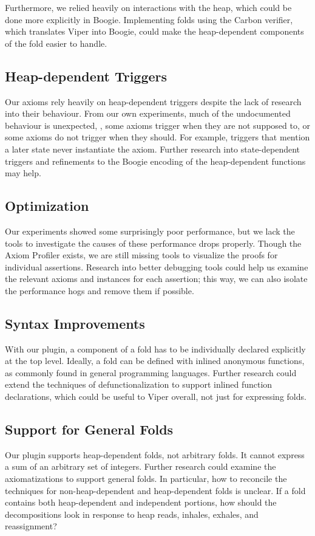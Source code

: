 \documentclass[msc,oneside]{ubcthesis}
\begin{document}
Furthermore, we relied heavily on interactions with the heap, which could be done more explicitly in Boogie. Implementing folds using the Carbon verifier, which translates Viper into Boogie, could make the heap-dependent components of the fold easier to handle. 

\subsection{Heap-dependent Triggers}
Our axioms rely heavily on heap-dependent triggers despite the lack of research into their behaviour. From our own experiments, much of the undocumented behaviour is unexpected, \ie, some axioms trigger when they are not supposed to, or some axioms do not trigger when they should. For example, triggers that mention a later state never instantiate the axiom. Further research into state-dependent triggers and refinements to the Boogie encoding of the heap-dependent functions may help. 


\subsection{Optimization}
Our experiments showed some surprisingly poor performance, but we lack the tools to investigate the causes of these performance drops properly. Though the Axiom Profiler exists, we are still missing tools to visualize the proofs for individual assertions. Research into better debugging tools could help us examine the relevant axioms and instances for each assertion; this way, we can also isolate the performance hogs and remove them if possible.

\subsection{Syntax Improvements}
With our plugin, a component of a fold has to be individually declared explicitly at the top level. Ideally, a fold can be defined with inlined anonymous functions, as commonly found in general programming languages. Further research could extend the techniques of defunctionalization to support inlined function declarations, which could be useful to Viper overall, not just for expressing folds.  

\subsection{Support for General Folds}
Our plugin supports heap-dependent folds, not arbitrary folds. It cannot express a sum of an arbitrary set of integers. Further research could examine the axiomatizations to support general folds. In particular, how to reconcile the techniques for non-heap-dependent and heap-dependent folds is unclear. If a fold contains both heap-dependent and independent portions, how should the decompositions look in response to heap reads, inhales, exhales, and reassignment? 
\end{document}
